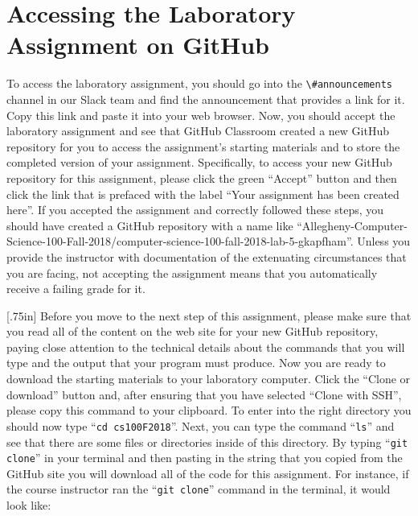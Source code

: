 \documentclass[11pt]{article}
\newcommand{\command}[1]{``\lstinline{#1}''}
\newcommand{\channel}[1]{\lstinline{#1}}
\newcommand{\caution}[1]{\null\hfill\LARGE{\faWarning{}}\newline\scriptsize{\em{#1}}}
\begin{document}

\section*{Accessing the Laboratory Assignment on GitHub}

To access the laboratory assignment, you should go into the
\channel{\#announcements} channel in our Slack team and find the announcement
that provides a link for it. Copy this link and paste it into your web browser.
Now, you should accept the laboratory assignment and see that GitHub Classroom
created a new GitHub repository for you to access the assignment's starting
materials and to store the completed version of your assignment. Specifically,
to access your new GitHub repository for this assignment, please click the green
``Accept'' button and then click the link that is prefaced with the label ``Your
assignment has been created here''. If you accepted the assignment and correctly
followed these steps, you should have created a GitHub repository with a name
like
``Allegheny-Computer-Science-100-Fall-2018/computer-science-100-fall-2018-lab-5-gkapfham''.
Unless you provide the instructor with documentation of the extenuating
circumstances that you are facing, not accepting the assignment means that you
automatically receive a failing grade for it.

\marginnote{\caution{Clone GitHub repository}}[.75in] Before you move to the
next step of this assignment, please make sure that you read all of the content
on the web site for your new GitHub repository, paying close attention to the
technical details about the commands that you will type and the output that your
program must produce. Now you are ready to download the starting materials to
your laboratory computer. Click the ``Clone or download'' button and, after
ensuring that you have selected ``Clone with SSH'', please copy this command to
your clipboard. To enter into the right directory you should now type
\command{cd cs100F2018}. Next, you can type the command \command{ls} and see
that there are some files or directories inside of this directory. By typing
\command{git clone} in your terminal and then pasting in the string that you
copied from the GitHub site you will download all of the code for this
assignment. For instance, if the course instructor ran the \command{git clone}
command in the terminal, it would look like:
\end{document}
